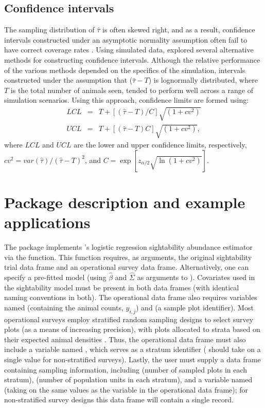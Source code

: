 \documentclass[nojss]{jss}
\begin{document}
\subsection{Confidence intervals}

The sampling distribution of $\hat{\tau}$ is often skewed right, and
as a result, confidence intervals constructed under an asymptotic
normality assumption often fail to have correct coverage rates
\citep{Wong1996, CoganDief1998}.  Using simulated data,
\citet{Wong1996} explored several alternative methods for
constructing confidence intervals.  Although the relative
performance of the various methods depended on the specifics of the
simulation, intervals constructed under the assumption that
($\hat{\tau}-T$) is lognormally distributed, where $T$ is the total
number of animals seen, tended to perform well across a range of
simulation scenarios. Using this approach, confidence limits are
formed using:
\begin{eqnarray}
 LCL & = & T + [(\hat{\tau}-T)/C]\sqrt{(1+cv^2)} \\
 UCL & = & T+[(\hat{\tau}-T)C]\sqrt{(1+cv^2)},
\end{eqnarray}
where $LCL$ and $UCL$ are the lower and upper confidence limits,
respectively, $cv^2 = var(\hat{\tau})/(\hat{\tau}-T)^2$, and $C =
\exp[z_{\alpha/2}\sqrt{\ln{(1+cv^2)}}]$.

\section{Package description and example applications}
The  package implements \citet{SS1989}'s
logistic regression sightability abundance estimator via the
 function. This function requires, as arguments, the
original sightability trial data frame and an operational survey
data frame. Alternatively, one can specify a pre-fitted model (using
$\hat{\beta}$ and $\hat{\Sigma}$ as arguments to ).
Covariates used in the sightability model must be present in both
data frames (with identical naming conventions in both).  The
operational data frame also requires variables named 
(containing the animal counts, $y_{i,j}$) and  (a
sample plot identifier).  Most operational surveys employ stratified
random sampling designs to select survey plots (as a means of
increasing precision), with plots allocated to strata based on their
expected animal densities \citep[e.g., `low', `medium', and
`high';][]{FiebLenarz}. Thus, the operational data frame must also
include a variable named , which serves as a stratum
identifier ( should take on a single value for
non-stratified surveys). Lastly, the user must supply a data frame
containing sampling information, including  (number of
sampled plots in each stratum),  (number of population
units in each stratum), and a variable named  (taking
on the same values as the  variable in the operational
data frame); for non-stratified survey designs this data frame will
contain a single record.
\end{document}

